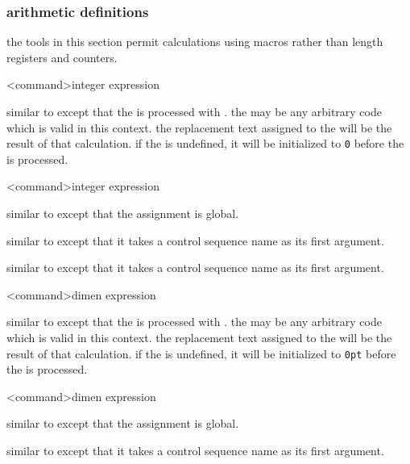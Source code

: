 \subsubsection{arithmetic definitions}
\label{aut:def:cal}

the tools in this section permit calculations using macros rather than length registers and counters.

\begin{ltxsyntax}

<command>{integer expression}

similar to  except that the  is processed with . the  may be any arbitrary code which is valid in this context. the replacement text assigned to the  will be the result of that calculation. if the  is undefined, it will be initialized to \texttt{0} before the  is processed.

<command>{integer expression}

similar to  except that the assignment is global.


similar to  except that it takes a control sequence name as its first argument.


similar to  except that it takes a control sequence name as its first argument.

<command>{dimen expression}

similar to  except that the  is processed with . the  may be any arbitrary code which is valid in this context. the replacement text assigned to the  will be the result of that calculation. if the  is undefined, it will be initialized to \texttt{0pt} before the  is processed.

<command>{dimen expression}

similar to  except that the assignment is global.


similar to  except that it takes a control sequence name as its first argument.



\end{ltxsyntax}
